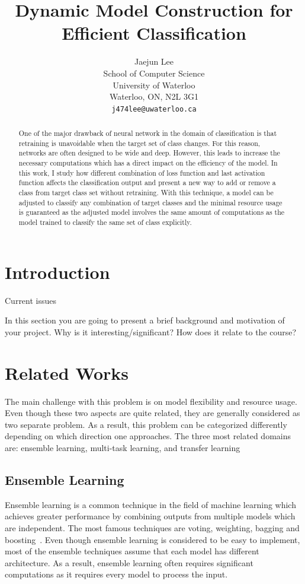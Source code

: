 \documentclass{article}
\title{Dynamic Model Construction for Efficient Classification}
\author{
    Jaejun Lee \\
    School of Computer Science\\
    University of Waterloo\\
    Waterloo, ON, N2L 3G1 \\
    \texttt{j474lee@uwaterloo.ca} \\
}
\begin{document}
\maketitle

\begin{abstract}

One of the major drawback of neural network in the domain of classification is that retraining is unavoidable when the target set of class changes. For this reason, networks are often designed to be wide and deep. However, this leads to increase the necessary computations which has a direct impact on the efficiency of the model. In this work, I study how different combination of loss function and last activation function affects the classification output and present a new way to add or remove a class from target class set without retraining. With this technique, a model can be adjusted to classify any combination of target classes and the minimal resource usage is guaranteed as the adjusted model involves the same amount of computations as the model trained to classify the same set of class explicitly.

\end{abstract}

\section{Introduction}

Current issues


In this section you are going to present a brief background and motivation of your project. Why is it interesting/significant? How does it relate to the course?

\section{Related Works}

The main challenge with this problem is on model flexibility and resource usage. Even though these two aspects are quite related, they are generally considered as two separate problem. As a result, this problem can be categorized differently depending on which direction one approaches. The three most related domains are: ensemble learning, multi-task learning, and transfer learning

\subsection{Ensemble Learning}
Ensemble learning is a common technique in the field of machine learning which achieves greater performance by combining outputs from multiple models which are independent. The most famous techniques are voting, weighting, bagging and boosting~\cite{dietterich2000ensemble, breiman1996bagging, freund1996experiments}. Even though ensemble learning is considered to be easy to implement, most of the ensemble techniques assume that each model has different architecture. As a result, ensemble learning often requires significant computations as it requires every model to process the input.
\end{document}

